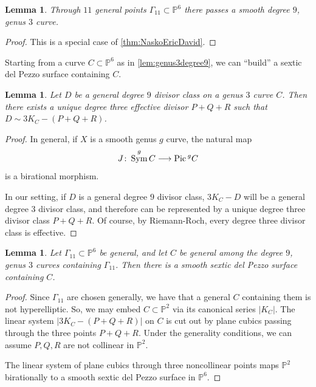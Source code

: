 \documentclass[reqno, 11pt]{amsart}
\theoremstyle{definition}
\theoremstyle{remark}
\numberwithin{equation}{section}
\numberwithin{thm}{section}
\numberwithin{prop}{section}
\numberwithin{lem}{section}
\numberwithin{cor}{section}
\numberwithin{conj}{section}
\numberwithin{defn}{section}
\renewcommand{\to}{\longrightarrow}
\newcommand {\from}{{\colon}}
\newcommand {\Pic}{{\rm Pic}\,}
\DeclareMathOperator\Sym{Sym}
\theoremstyle{plain}
\newtheorem{lemma}[theorem]{Lemma}
\theoremstyle{definition}
\newcommand\bp{{\mathbb P}}
\begin{document}
\begin{lemma}\label{lem:genus3degree9}
Through $11$ general points $\Gamma_{11} \subset \bp^{6}$ there passes a smooth degree $9$, genus $3$ curve. 
\end{lemma}

\begin{proof}
This is a special case of \autoref{thm:NaskoEricDavid}.
\end{proof}

Starting from a curve $C \subset \bp^{6}$ as in \autoref{lem:genus3degree9}, we can ``build'' a sextic del Pezzo surface containing $C$.

\begin{lemma}\label{lem:p+q+r}
Let $D$ be a general degree $9$ divisor class on a genus $3$ curve $C$. Then there exists a unique degree three effective divisor $P+Q+R$ such that $D \sim 3K_{C} - (P+Q+R)$.
\end{lemma} 

\begin{proof}
In general, if $X$ is a smooth genus $g$ curve, the natural map \[J \from \Sym^{g}C \to \Pic^{g}C\] is a birational morphism. 


In our setting, if $D$ is a general degree $9$ divisor class, $3K_C - D$ will be a general degree $3$ divisor class, and therefore can be represented by a unique degree three divisor class $P+Q+R$. Of course, by Riemann-Roch,
every degree three divisor class is effective.
\end{proof}

\begin{lemma}\label{lem:sexticcontainingC}
	Let $\Gamma_{11} \subset \bp^{6}$ be general, and let $C$ be general among the degree $9$, genus $3$ curves containing $\Gamma_{11}$.  Then there is a smooth sextic del Pezzo surface containing $C$.
\end{lemma}

\begin{proof}
Since $\Gamma_{11}$ are chosen generally, we have that a general $C$ containing them is not hyperelliptic.
So, we may embed $C \subset \bp^{2}$ via its canonical series $|K_{C}|$. The linear system $|3K_{C} - (P + Q + R)|$ on $C$ is cut out by plane cubics passing through the three points $P + Q + R$. Under the generality conditions, we can assume $P,Q,R$ are not collinear in $\bp^{2}$.

The linear system of plane cubics through three noncollinear points maps $\bp^{2}$ birationally to a smooth sextic del Pezzo surface in $\bp^{6}$.
\end{proof}
\end{document}
